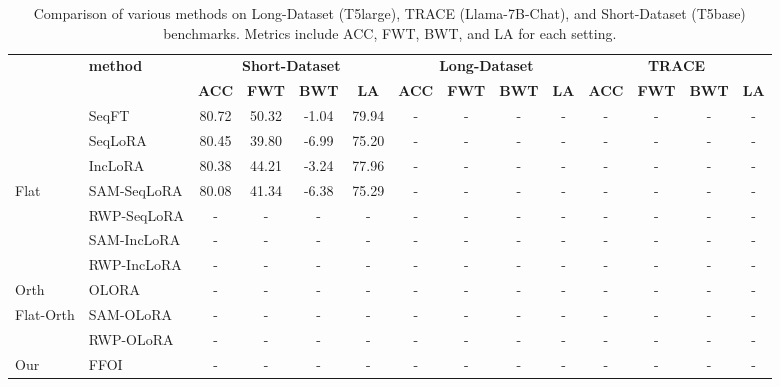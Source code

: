 \documentclass[letterpaper]{article} %
\begin{document}
\begin{table}[thbp]
\centering
\begin{tabular}{llcccccccccccc}
\toprule
 & \multirow{2}{*}{\textbf{method}} 
    & \multicolumn{4}{c}{\textbf{Short-Dataset}} 
    & \multicolumn{4}{c}{\textbf{Long-Dataset }}
    & \multicolumn{4}{c}{\textbf{TRACE}} \\
\cmidrule(lr){3-6} \cmidrule(lr){7-10} \cmidrule(lr){11-14}
 & & \textbf{ACC} & \textbf{FWT} & \textbf{BWT} & \textbf{LA}
   & \textbf{ACC} & \textbf{FWT} & \textbf{BWT} & \textbf{LA}
   & \textbf{ACC} & \textbf{FWT} & \textbf{BWT} & \textbf{LA} \\
\midrule
\multirow{3}{*}{} 
    & SeqFT       & 80.72 & 50.32 & -1.04 & 79.94 & - & - & - & - & - & - & - & - \\
    & SeqLoRA     & 80.45 & 39.80 & -6.99 & 75.20 & - & - & - & - & - & - & - & - \\
    & IncLoRA    & 80.38 & 44.21 & -3.24 & 77.96 & - & - & - & - & - & - & - & - \\
\midrule

\multirow{4}{*}{Flat} 
    & SAM-SeqLoRA & 80.08 & 41.34 & -6.38 & 75.29 & - & - & - & - & - & - & - & - \\ 
    & RWP-SeqLoRA & - & - & - & - & - & - & - & - & - & - & - & - \\
    & SAM-IncLoRA & - & - & - & - & - & - & - & - & - & - & - & - \\ 
    & RWP-IncLoRA & - & - & - & - & - & - & - & - & - & - & - & - \\
\midrule
\multirow{1}{*}{Orth} 
    & OLORA       & - & - & - & - & - & - & - & - & - & - & - & - \\
\midrule
\multirow{2}{*}{Flat-Orth} 
    & SAM-OLoRA & - & - & - & - & - & - & - & - & - & - & - & - \\ 
    & RWP-OLoRA & - & - & - & - & - & - & - & - & - & - & - & - \\
\midrule
\multirow{1}{*}{Our} 
    & FFOI         & - & - & - & - & - & - & - & - & - & - & - & - \\
\bottomrule
\end{tabular}
\caption{Comparison of various methods on Long-Dataset (T5large), TRACE (Llama-7B-Chat), and Short-Dataset (T5base) benchmarks. Metrics include ACC, FWT, BWT, and LA for each setting.}
\label{tab:main_cl_benchmark}
\end{table}
\end{document}
